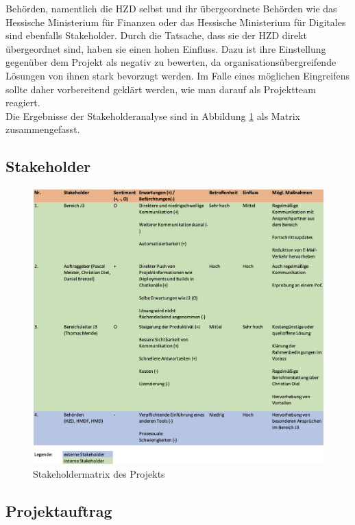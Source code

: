 \documentclass[ThesisDJ.tex]{subfiles}
\begin{document}
  Behörden, namentlich die HZD selbst und ihr übergeordnete Behörden wie das Hessische Ministerium für Finanzen oder das Hessische Ministerium 
  für Digitales sind ebenfalls Stakeholder. Durch die Tatsache, dass sie der HZD direkt übergeordnet sind, haben sie einen hohen Einfluss. Dazu 
  ist ihre Einstellung gegenüber dem Projekt als negativ zu bewerten, da organisationsübergreifende Lösungen von ihnen stark bevorzugt werden.
  Im Falle eines möglichen Eingreifens sollte daher vorbereitend geklärt werden, wie man darauf als Projektteam reagiert. \\

  Die Ergebnisse der Stakeholderanalyse sind in Abbildung \ref{fig:stakeholders} als Matrix zusammengefasst.

  \newpage
  \subsection{Stakeholder}
    \begin{figure}[h!]
      \includegraphics[width=\textwidth]{stakeholders.png}
      \centering
      \caption{Stakeholdermatrix des Projekts}
      \label{fig:stakeholders}
    \end{figure}

	
	\subsection{Projektauftrag}
	
\end{document}
